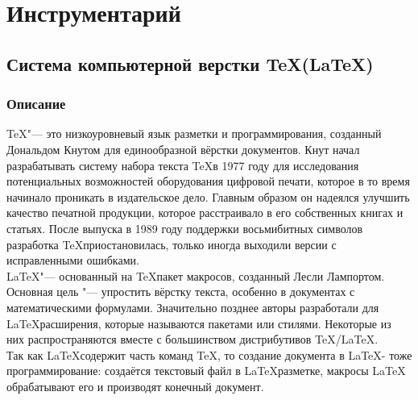 \documentclass{article}
\begin{document}
\section{Инструментарий}	
	\subsection{Система компьютерной верстки \TeX(\LaTeX)}
		\subsubsection{Описание}
	\TeX "--- это низкоуровневый язык разметки и программирования, созданный Дональдом Кнутом для единообразной вёрстки документов. Кнут начал разрабатывать систему набора текста \TeX в 1977 году для исследования потенциальных возможностей оборудования цифровой печати, которое в то время начинало проникать в издательское дело. Главным образом он надеялся улучшить качество печатной продукции, которое расстраивало в его собственных книгах и статьях. После выпуска в 1989 году поддержки восьмибитных символов разработка \TeX приостановилась, только иногда выходили версии с исправленными ошибками.\\

	\LaTeX  "--- основанный на \TeX пакет макросов, созданный Лесли Лампортом. Основная цель "--- упростить вёрстку текста, особенно в документах с математическими формулами. Значительно позднее авторы разработали для \LaTeX расширения, которые называются пакетами или стилями. Некоторые из них распространяются вместе с большинством дистрибутивов \TeX/\LaTeX.\\

	Так как \LaTeX содержит часть команд \TeX, то создание документа в \LaTeX - тоже программирование: создаётся текстовый файл в \LaTeX разметке, макросы LaTeX обрабатывают его и производят конечный документ.\\
\end{document}
